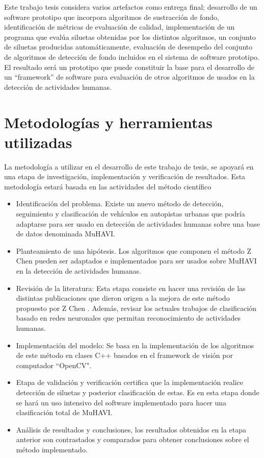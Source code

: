 Este trabajo tesis considera varios artefactos como entrega final; desarrollo de un software prototipo que incorpora algoritmos de sustracción de fondo, identificación de métricas de evaluación de calidad, implementación de un programa que evalúa siluetas obtenidas por los distintos algoritmos, un conjunto de siluetas producidas automáticamente, evaluación de desempeño del conjunto de algoritmos de detección de fondo incluidos en el sistema de software prototipo.
El resultado será un prototipo que puede constituir la base para el desarrollo de un ``framework'' de software para evaluación de otros algoritmos de usados en la detección de actividades humanas.


\section{Metodologías y herramientas utilizadas} 

\indent La metodología a utilizar en el desarrollo de este trabajo de tesis, se apoyará en una etapa de investigación, implementación y verificación de resultados. Esta metodología estará basada en las actividades del método científico

\begin{itemize}
\item Identificación del problema. Existe un nuevo método de detección, seguimiento y clasificación de vehículos en autopistas urbanas que podría adaptarse para ser usado en detección de actividades humanas sobre una base de datos denominada MuHAVI.

\item Planteamiento de una hipótesis. Los algoritmos que componen el método Z Chen \cite{chen_vehicle_2012} pueden ser adaptados e implementados para ser usados sobre MuHAVI en la detección de actividades humanas.

\item Revisión de la literatura: Esta etapa consiste en hacer una revisión de las distintas publicaciones que dieron origen a la mejora de este método propuesto por Z Chen \cite{chen_vehicle_2012}. Además, revisar los actuales trabajos de clasificación basado en redes neuronales que permitan reconocimiento de actividades humanas.

\item Implementación del modelo: Se basa en la implementación de los algoritmos de este método en clases C++ basados en el framework de visión por computador ``OpenCV".

\item Etapa de validación y verificación certifica que la implementación realice detección de siluetas y posterior clasificación de estas. Es en esta etapa donde se hará un uso intensivo del software implementado para hacer una clasificación total de MuHAVI.

\item Análisis de resultados y conclusiones, los resultados obtenidos en la etapa anterior son contrastados y comparados para obtener conclusiones sobre el método implementado.
\end{itemize}

